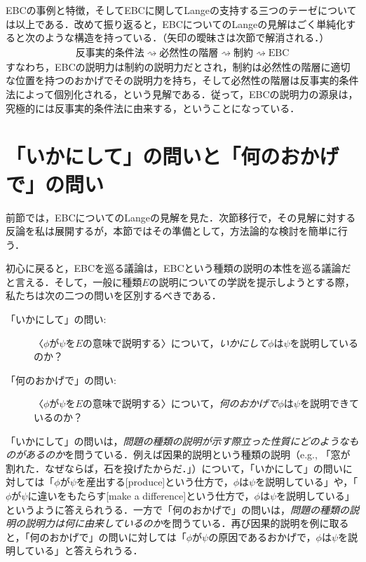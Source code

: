 \documentclass[dvipdfmx,twoside,11pt,uplatex]{jsarticle}
\theoremstyle{definition}
\begin{document}
EBCの事例と特徴，そしてEBCに関してLangeの支持する三つのテーゼについては以上である．改めて振り返ると，EBCについてのLangeの見解はごく単純化すると次のような構造を持っている．（矢印の曖昧さは次節で解消される．）
\begin{align*}
    反事実的条件法 \rightsquigarrow 必然性の階層 \rightsquigarrow 制約 \rightsquigarrow \text{EBC}
\end{align*}
すなわち，EBCの説明力は制約の説明力だとされ，制約は必然性の階層に適切な位置を持つのおかげでその説明力を持ち，そして必然性の階層は反事実的条件法によって個別化される，という見解である．従って，EBCの説明力の源泉は，究極的には反事実的条件法に由来する，ということになっている．

\section{「いかにして」の問いと「何のおかげで」の問い}\label{howandwhat}
前節では，EBCについてのLangeの見解を見た．次節移行で，その見解に対する反論を私は展開するが，本節ではその準備として，方法論的な検討を簡単に行う．

初心に戻ると，EBCを巡る議論は，EBCという種類の説明の本性を巡る議論だと言える．そして，一般に種類$E$の説明についての学説を提示しようとする際，私たちは次の二つの問いを区別するべきである．
    \begin{description}
    \item[「いかにして」の問い:]〈$\phi$が$\psi$を$E$の意味で説明する〉について，\emph{いかにして}$\phi$は$\psi$を説明しているのか？
    \item[「何のおかげで」の問い:]〈$\phi$が$\psi$を$E$の意味で説明する〉について，\emph{何のおかげで}$\phi$は$\psi$を説明できているのか？
    \end{description}
「いかにして」の問いは，\emph{問題の種類の説明が示す際立った性質にどのようなものがあるのか}を問うている．例えば因果的説明という種類の説明（e.g., 「窓が割れた．なぜならば，石を投げたからだ．」）について，「いかにして」の問いに対しては「$\phi$が$\psi$を産出する[produce]という仕方で，$\phi$は$\psi$を説明している」や，「$\phi$が$\psi$に違いをもたらす[make a difference]という仕方で，$\phi$は$\psi$を説明している」というように答えられうる．一方で「何のおかげで」の問いは，\emph{問題の種類の説明の説明力は何に由来しているのか}を問うている．再び因果的説明を例に取ると，「何のおかげで」の問いに対しては「$\phi$が$\psi$の原因であるおかげで，$\phi$は$\psi$を説明している」と答えられうる．
\end{document}
